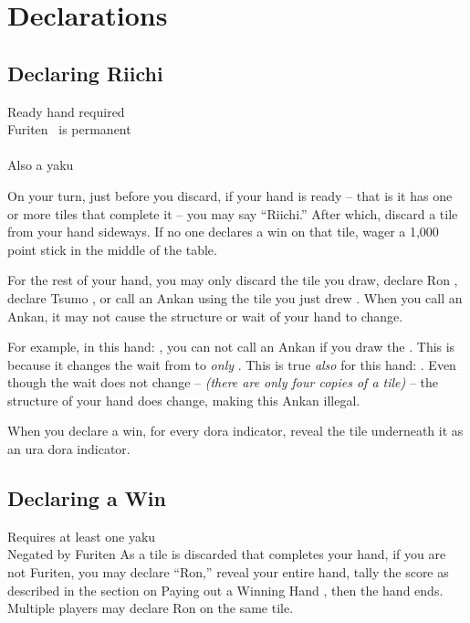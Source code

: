 \section{Declarations}\label{core:sec:declarations}

\subsection{Declaring Riichi}\label{core:ssec:declaring-riichi}

	{\symbalert Ready hand required\\
	\symbalert Furiten~ is permanent\\
	\closedhand\\
	\upgradestoother Also a yaku~}
	{On your turn, just before you discard, if your hand is ready -- that is it has one or more tiles that complete it -- you may say ``Riichi.'' After which, discard a tile from your hand sideways. If no one declares a win on that tile, wager a 1,000 point stick in the middle of the table.

	For the rest of your hand, you may only discard the tile you draw, declare Ron , declare Tsumo , or call an Ankan using the tile you just drew . When you call an Ankan, it may not cause the structure or wait of your hand to change.

	For example, in this hand: {}, you can not call an Ankan if you draw the {}. This is because it changes the wait from {} to \emph{only} {}. This is true \emph{also} for this hand: {}. Even though the wait does not change -- \textit{(there are only four copies of a tile)} -- the structure of your hand does change, making this Ankan illegal.

	When you declare a win, for every dora indicator, reveal the tile underneath it as an ura dora indicator.}

\subsection{Declaring a Win}\label{core:ssec:declaring-a-win}

	{\symbalert Requires at least one yaku \\
	\symbnegate Negated by Furiten }
	{As a tile is discarded that completes your hand, if you are not Furiten, you may declare ``Ron,'' reveal your entire hand, tally the score as described in the section on Paying out a Winning Hand , then the hand ends. Multiple players may declare Ron on the same tile.}

